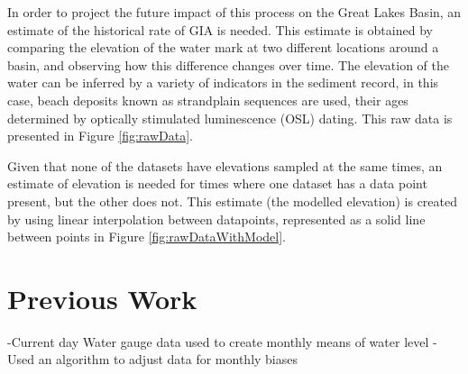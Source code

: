\documentclass{article}
\begin{document}
 In order to project the future impact of this process on the Great Lakes Basin,
 an estimate of the historical rate of GIA is needed. This estimate is obtained by
 comparing the elevation of the water mark at two different locations around a basin, and
 observing how this difference changes over time. The elevation of the water can be inferred
 by a variety of indicators in the sediment record, in this case, beach deposits known
 as strandplain sequences are used, their ages determined by optically stimulated
 luminescence (OSL) dating. This raw data is presented in Figure \ref{fig:rawData}.\\


\newpage 
 
 Given that none of the datasets have elevations sampled
 at the same times, an estimate of elevation is needed for times where one dataset
 has a data point present, but the other does not. This estimate 
 (the modelled elevation) is created by using linear interpolation between datapoints,
 represented as a solid line between points in Figure \ref{fig:rawDataWithModel}.\\

 
\newpage

\section{Previous Work} 
-Current day Water gauge data used to create monthly means of water level
-Used an algorithm to adjust data for monthly biases 

\end{document}
